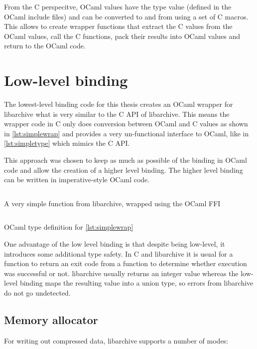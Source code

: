 \documentclass[parskip=half]{scrreprt}
\newcommand\inline[1]{{\addfontfeature{Letters=SmallCaps}#1}}
\begin{document}
From the C perspecitve, OCaml values have the type \inline{value} (defined in
the OCaml include files) and can be converted to and from using a set of C
macros. This allows to create wrapper functions that extract the C values from
the OCaml values, call the C functions, pack their results into OCaml values
and return to the OCaml code.

\section{Low-level binding}
\label{sec:lowlevel}

The lowest-level binding code for this thesis creates an OCaml wrapper for
libarchive what is very similar to the C API of libarchive. This means the
wrapper code in C only does conversion between OCaml and C values as shown in
\autoref{lst:simplewrap} and provides a very un-functional interface to OCaml,
like in \autoref{lst:simpletype} which mimics the C API.

This approach was chosen to keep as much as possible of the binding in OCaml
code and allow the creation of a higher level binding. The higher level binding
can be written in imperative-style OCaml code.

\begin{listing}[h]
  \inputminted[linenos]{c}{simple-wrap.c}
  \caption{A very simple function from libarchive, wrapped using the OCaml FFI}
  \label{lst:simplewrap}
\end{listing}

\begin{listing}[h]
  \inputminted[linenos]{ocaml}{simple-wrap.ml}
  \caption{OCaml type definition for \autoref{lst:simplewrap}}
  \label{lst:simpletype}
\end{listing}

One advantage of the low level binding is that despite being low-level, it
introduces some additional type safety. In C and libarchive it is usual for a
function to return an exit code from a function to determine whether execution
was successful or not. libarchive usually returns an integer value whereas the
low-level binding maps the resulting value into a union type, so errors from
libarchive do not go undetected.

\subsection{Memory allocator}
\label{sec:allocator}

For writing out compressed data, libarchive supports a number of modes:
\end{document}

